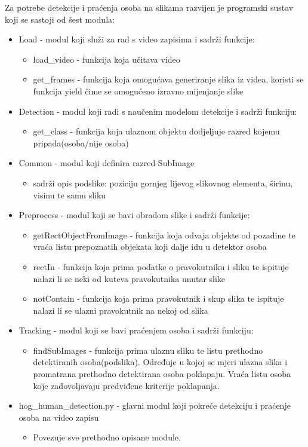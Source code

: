\documentclass[utf8, seminar, numeric, times]{fer}
\begin{document}
Za potrebe detekcije i praćenja osoba na slikama razvijen je programski sustav koji se sastoji od šest modula:
\begin{itemize}
	\item Load - modul koji služi za rad s video zapisima i sadrži funkcije:
	\begin{itemize}
		\item load\_video - funkcija koja učitava video 
		\item get\_frames - funkcija koja omogućava generiranje slika iz videa, koristi se funkcija yield čime se omogućeno izravno mijenjanje slike
	\end{itemize}
	
	\item Detection - modul koji radi s naučenim modelom detekcije i sadrži funkciju:
	\begin{itemize}
		\item get\_class - funkcija koja ulaznom objektu dodjeljuje razred kojemu pripada(osoba/nije osoba)
	\end{itemize}
	\item Common - modul koji definira razred SubImage 
	\begin{itemize}
	
	\item sadrži opis podslike: poziciju gornjeg lijevog slikovnog elementa, širinu, visinu te 
			 samu sliku
	\end{itemize}
	
	\item Preprocess - modul koji se bavi obradom slike i sadrži funkcije:
		\begin{itemize}
		\item getRectObjectFromImage - funkcija koja odvaja objekte od pozadine te vraća listu prepoznatih objekata koji dalje idu u detektor osoba
		\item rectIn - funkcija koja prima podatke o pravokutniku i sliku te ispituje nalazi li se neki od kuteva pravokutnika unutar slike 
		\item notContain - funkcija koja prima pravokutnik i skup slika te ispituje nalazi li se ulazni pravokutnik na nekoj od slika 
\end{itemize}

	\item Tracking - modul koji se bavi praćenjem osoba i sadrži funkciju:
		\begin{itemize}
			\item findSubImages - funkcija prima ulaznu sliku te listu prethodno detektiranih osoba(podslika). 
		  Određuje u kojoj se mjeri ulazna slika i promatrana prethodno detektirana osoba poklapaju.
		  Vraća listu osoba koje zadovoljavaju predviđene kriterije poklapanja. 
	\end{itemize}
	
	\item hog\_human\_detection.py - glavni modul koji pokreće detekciju i praćenje osoba na video zapisu
		\begin{itemize}
			\item Povezuje sve prethodno opisane module. 
		\end{itemize}
\end{itemize}
\end{document}
